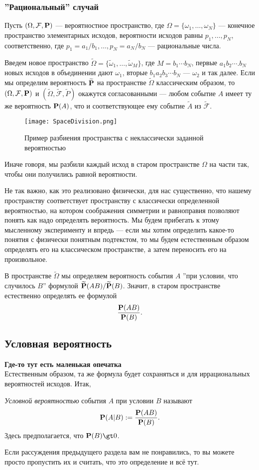 \documentclass[11 pt,russian]{article}
\begin{document}
\subsubsection{''Рациональный'' случай}
Пусть $(\Omega,\mathcal{F},{\bf P})$ --- вероятностное пространство, где $\Omega=\{\omega_1,\dotsc,\omega_N\}$ --- конечное пространство элементарных исходов, вероятности исходов равны $p_1,\dotsc,p_N$, соответственно, где $p_1=a_1/b_1,\dotsc,p_N = a_N/b_N$ --- рациональные числа. 

Введем новое пространство $\widetilde{\Omega} = \{\widetilde{\omega}_1,\dotsc,\widetilde{\omega}_M\}$, где $M = b_1 \dotsm b_N$, первые $a_1 b_2 \dotsm. b_N$ новых исходов в объединении дают $\omega_1$,  вторые $b_1 a_2 b_3 \dotsm b_N$ --- $\omega_2$ и так далее. Если мы определим вероятность $\widetilde{{\bf P}}$ на пространстве $\widetilde{\Omega}$ классическим образом, то $(\Omega,\mathcal{F},{\bf P})$ и $(\widetilde{\Omega},\widetilde{\mathcal{F}},\widetilde{P})$ окажутся согласованными --- любом событие $A$ имеет ту же вероятность ${\bf P}(A)$, что и соответствующее ему событие $\widetilde{A}$ из $\widetilde{\mathcal{F}}$. 
\begin{figure}[h!]
\caption{Пример разбиения пространства с неклассически заданной вероятностью}
   \begin{center}
   \texttt{[image: SpaceDivision.png]}
   \end{center}
\end{figure}
Иначе говоря, мы разбили каждый исход в старом пространстве $\Omega$ на части так, чтобы они получились равной вероятности.

Не так важно, как это реализовано физически, для нас существенно, что нашему пространству соответствует пространству с классически определенной вероятностью, на котором соображения симметрии и равноправия позволяют понять как надо определять вероятность. Мы будем прибегать к этому мысленному эксперименту и впредь --- если мы хотим определить какое-то понятия с физически понятным подтекстом, то мы будем естественным образом определять его на классическом пространстве, а затем переносить его на произвольное. 

В пространстве $\widetilde{\Omega}$ мы определяем вероятность события $A$ ''при условии, что случилось $B$'' формулой $\widetilde{{\bf P}}(AB)/\widetilde{{\bf P}}(B)$. Значит, в старом пространстве естественно определять ее формулой
$$
\frac{{\bf P}(AB)}{{\bf P}(B)}.
$$
\subsection{Условная вероятность}
\label{CondProb}
{\bf Где-то тут есть маленькая опечатка\\ }
Естественным образом, та же формула будет сохраняться и для иррациональных вероятностей исходов. Итак,
\begin{Def}
{\it Условной вероятностью} события $A$ при условии $B$ называют
$$
{\bf P}(A|B):= \frac{{\bf P}(A B)}{{\bf P}(B)}.
$$
Здесь предполагается, что ${\bf P}(B)\gt 0$. 
\end{Def}
Если рассуждения предыдущего раздела вам не понравились, то вы можете просто пропустить их и считать, что это определение и всё тут.
\end{document}
